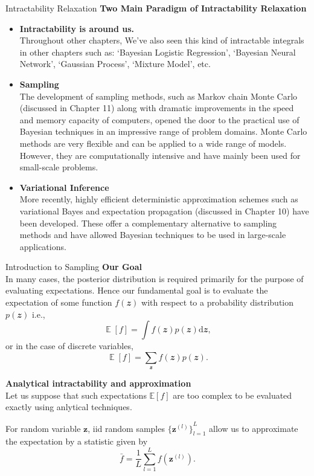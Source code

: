 \documentclass{bredelebeamer}
\DeclareMathOperator*{\E}{\mathbb{E}}
\begin{document}
\begin{frame}{Intractability Relaxation}
  \textbf{Two Main Paradigm of Intractability Relaxation}
  \begin{itemize}
    \item \textbf{Intractability is around us.} \\
    Throughout other chapters, We've also seen this kind of intractable
    integrals in other chapters such as: `Bayesian Logistic Regression',
    `Bayesian Neural Network', `Gaussian Process', `Mixture Model', etc.

    \item \textbf{Sampling} \\
    The development of sampling methods, such as Markov chain Monte Carlo
    (discussed in Chapter 11) along with dramatic improvements in the speed
    and memory capacity of computers, opened the door to the practical use
    of Bayesian techniques in an impressive range of problem domains. Monte
    Carlo methods are very flexible and can be applied to a wide range of
    models. However, they are computationally intensive and have mainly
    been used for small-scale problems.

    \item \textbf{Variational Inference} \\
    More recently, highly efficient deterministic approximation schemes such
    as variational Bayes and expectation propagation (discussed in Chapter 10)
    have been developed. These offer a complementary alternative to sampling
    methods and have allowed Bayesian techniques to be used in large-scale
    applications.
  \end{itemize}
\end{frame}

\begin{frame}{Introduction to Sampling}
  \textbf{Our Goal}\\
  In many cases, the posterior distribution is required primarily for the
  purpose of evaluating expectations. Hence our fundamental goal is to
  evaluate the expectation of some function $f(\mathbfit{z})$ with respect
  to a probability distribution $p(\mathbfit{z})$ i.e.,
  \begin{equation}
    \E[f] = \int f(\mathbfit{z})p(\mathbfit{z}) \mathrm{d}\mathbfit{z},
  \end{equation}
  or in the case of discrete variables,
  \begin{equation}
    \E[f] = \sum_{\mathbfit{z}} f(\mathbfit{z})p(\mathbfit{z}).
  \end{equation}

  \textbf{Analytical intractability and approximation}\\
  Let us suppose that such expectations $\mathbb{E}[f]$ are too complex to be
  evaluated exactly using anlytical techniques.

  For random variable $\mathbf{z}$, iid random samples
  ${\{\mathbf{z}^{(l)}\}}_{l=1}^{L}$ allow us to approximate the expectation
  by a statistic given by
  \begin{equation}
    \bar{f} = \frac{1}{L}\sum_{l=1}^{L} f(\mathbf{z}^{(l)}).
  \end{equation}
\end{frame}
\end{document}
